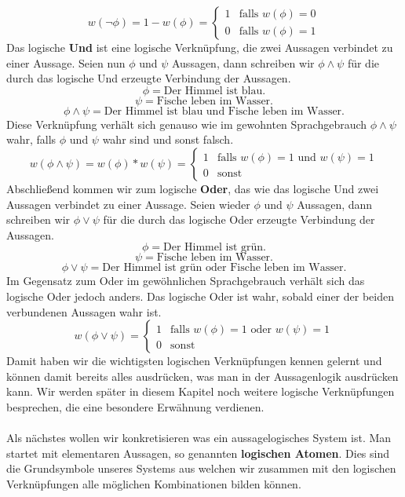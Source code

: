 \documentclass[11pt,a4paper,leqno]{report}
\numberwithin{equation}{chapter}
\begin{document}
\begin{equation}
w(\neg\phi)= 1 - w(\phi)=
\begin{cases} 
1 & \text{falls }w(\phi)=0\\
0 & \text{falls }w(\phi)=1
\end{cases}
\end{equation}
Das logische \textbf{Und} ist eine logische Verknüpfung, die zwei Aussagen verbindet zu einer Aussage. Seien nun $\phi$ und $\psi$ Aussagen, dann schreiben wir $\phi\wedge\psi$ für die durch das logische Und erzeugte Verbindung der Aussagen.
$$\phi = \text{Der Himmel ist blau.}$$
$$\psi = \text{Fische leben im Wasser.}$$
$$\phi\wedge\psi = \text{Der Himmel ist blau und Fische leben im Wasser.}$$
Diese Verknüpfung verhält sich genauso wie im gewohnten Sprachgebrauch $\phi\wedge\psi$ wahr, falls $\phi$ und $\psi$ wahr sind und sonst falsch.
\begin{equation}
w(\phi\wedge\psi) = w(\phi) * w(\psi)=
\begin{cases} 
1 & \text{falls }w(\phi)=1\text{ und }w(\psi)=1\\
0 & \text{sonst}
\end{cases}
\end{equation}
Abschließend kommen wir zum logische \textbf{Oder}, das wie das logische Und zwei Aussagen verbindet zu einer Aussage. Seien wieder $\phi$ und $\psi$ Aussagen, dann schreiben wir $\phi\vee\psi$ für die durch das logische Oder erzeugte Verbindung der Aussagen.
$$\phi = \text{Der Himmel ist grün.}$$
$$\psi = \text{Fische leben im Wasser.}$$
$$\phi\vee\psi = \text{Der Himmel ist grün oder Fische leben im Wasser.}$$
Im Gegensatz zum Oder im gewöhnlichen Sprachgebrauch verhält sich das logische Oder jedoch anders. Das logische Oder ist wahr, sobald einer der beiden verbundenen Aussagen wahr ist.
\begin{equation}
w(\phi\vee\psi) = 
\begin{cases} 
1 & \text{falls }w(\phi)=1\text{ oder }w(\psi)=1\\
0 & \text{sonst}
\end{cases}
\end{equation}
Damit haben wir die wichtigsten logischen Verknüpfungen kennen gelernt und können damit bereits alles ausdrücken, was man in der Aussagenlogik ausdrücken kann. Wir werden später in diesem Kapitel noch weitere logische Verknüpfungen besprechen, die eine besondere Erwähnung verdienen.\\
\\
Als nächstes wollen wir konkretisieren was ein aussagelogisches System ist. Man startet mit elementaren Aussagen, so genannten \textbf{logischen Atomen}. Dies sind die Grundsymbole unseres Systems aus welchen wir zusammen mit den logischen Verknüpfungen alle möglichen Kombinationen bilden können. 
\end{document}
